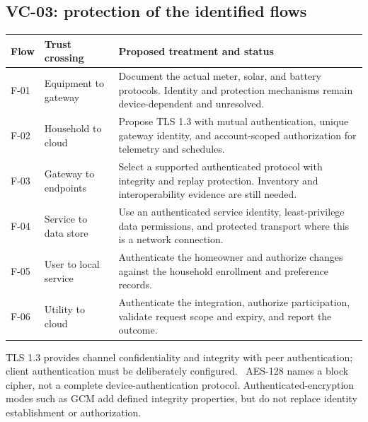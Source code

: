 \documentclass[11pt,letterpaper]{article}
\newcommand{\tablehead}[1]{\sffamily\bfseries\color{Navy}#1}
\begin{document}
\subsection{VC-03: protection of the identified flows}
{\small
\begin{tabularx}{\linewidth}{@{}L{0.59in}L{1.34in}Y@{}}
\toprule
\tablehead{Flow} & \tablehead{Trust crossing} & \tablehead{Proposed treatment and status}\\
\midrule
F-01 & Equipment to gateway & Document the actual meter, solar, and battery protocols.
Identity and protection mechanisms remain device-dependent and unresolved.\\
F-02 & Household to cloud & Propose TLS 1.3 with mutual authentication, unique gateway
identity, and account-scoped authorization for telemetry and schedules.\\
F-03 & Gateway to endpoints & Select a supported authenticated protocol with integrity
and replay protection. Inventory and interoperability evidence are still needed.\\
F-04 & Service to data store & Use an authenticated service identity, least-privilege
data permissions, and protected transport where this is a network connection.\\
F-05 & User to local service & Authenticate the homeowner and authorize changes against
the household enrollment and preference records.\\
F-06 & Utility to cloud & Authenticate the integration, authorize participation,
validate request scope and expiry, and report the outcome.\\
\bottomrule
\end{tabularx}}

TLS 1.3 provides channel confidentiality and integrity with peer authentication;
client authentication must be deliberately configured.~\cite{tls13}
AES-128 names a block cipher, not a complete device-authentication protocol.
Authenticated-encryption modes such as GCM add defined integrity properties,
but do not replace identity establishment or authorization.~\cite{aes,gcm}
\end{document}
